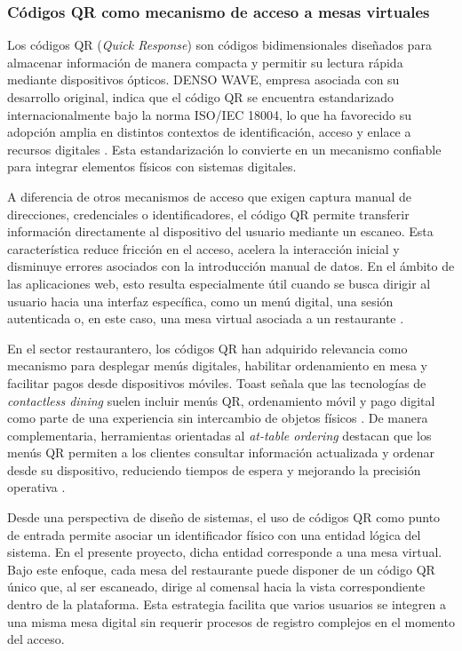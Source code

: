 \documentclass[12pt]{report}
\begin{document}
\subsubsection{Códigos QR como mecanismo de acceso a mesas virtuales}

Los códigos QR (\textit{Quick Response}) son códigos bidimensionales diseñados para almacenar información de manera compacta y permitir su lectura rápida mediante dispositivos ópticos. DENSO WAVE, empresa asociada con su desarrollo original, indica que el código QR se encuentra estandarizado internacionalmente bajo la norma ISO/IEC 18004, lo que ha favorecido su adopción amplia en distintos contextos de identificación, acceso y enlace a recursos digitales \cite{denso_qr_standard_2026}. Esta estandarización lo convierte en un mecanismo confiable para integrar elementos físicos con sistemas digitales.

A diferencia de otros mecanismos de acceso que exigen captura manual de direcciones, credenciales o identificadores, el código QR permite transferir información directamente al dispositivo del usuario mediante un escaneo. Esta característica reduce fricción en el acceso, acelera la interacción inicial y disminuye errores asociados con la introducción manual de datos. En el ámbito de las aplicaciones web, esto resulta especialmente útil cuando se busca dirigir al usuario hacia una interfaz específica, como un menú digital, una sesión autenticada o, en este caso, una mesa virtual asociada a un restaurante \cite{toast_qr_menus_2025,toast_contactless_dining_2025}.

En el sector restaurantero, los códigos QR han adquirido relevancia como mecanismo para desplegar menús digitales, habilitar ordenamiento en mesa y facilitar pagos desde dispositivos móviles. Toast señala que las tecnologías de \textit{contactless dining} suelen incluir menús QR, ordenamiento móvil y pago digital como parte de una experiencia sin intercambio de objetos físicos \cite{toast_contactless_dining_2025}. De manera complementaria, herramientas orientadas al \textit{at-table ordering} destacan que los menús QR permiten a los clientes consultar información actualizada y ordenar desde su dispositivo, reduciendo tiempos de espera y mejorando la precisión operativa \cite{toast_ordering_technology_2025,square_spring_food_beverage_2025}.

Desde una perspectiva de diseño de sistemas, el uso de códigos QR como punto de entrada permite asociar un identificador físico con una entidad lógica del sistema. En el presente proyecto, dicha entidad corresponde a una mesa virtual. Bajo este enfoque, cada mesa del restaurante puede disponer de un código QR único que, al ser escaneado, dirige al comensal hacia la vista correspondiente dentro de la plataforma. Esta estrategia facilita que varios usuarios se integren a una misma mesa digital sin requerir procesos de registro complejos en el momento del acceso.
\end{document}
